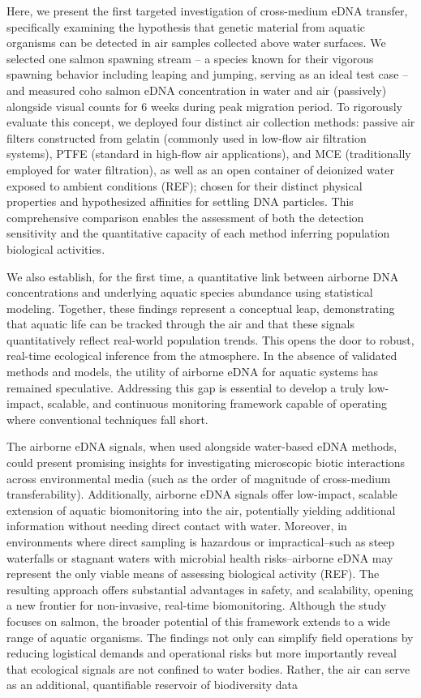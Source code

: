 \documentclass{article}
\begin{document}
Here, we present the first targeted investigation of cross-medium eDNA transfer, specifically examining the hypothesis that genetic material from aquatic organisms can be detected in air samples collected above water surfaces. We selected one salmon spawning stream -- a species known for their vigorous spawning behavior including leaping and jumping, serving as an ideal test case -- and measured coho salmon eDNA concentration in water and air (passively) alongside visual counts for 6 weeks during peak migration period. To rigorously evaluate this concept, we deployed four distinct air collection methods: passive air filters constructed from gelatin (commonly used in low-flow air filtration systems), PTFE (standard in high-flow air applications), and MCE (traditionally employed for water filtration), as well as an open container of deionized water exposed to ambient conditions (REF); chosen for their distinct physical properties and hypothesized affinities for settling DNA particles. This comprehensive comparison enables the assessment of both the detection sensitivity and the quantitative capacity of each method inferring population biological activities.

We also establish, for the first time, a quantitative link between airborne DNA concentrations and underlying aquatic species abundance using statistical modeling. Together, these findings represent a conceptual leap, demonstrating that aquatic life can be tracked through the air and that these signals quantitatively reflect real-world population trends. This opens the door to robust, real-time ecological inference from the atmosphere. In the absence of validated methods and models, the utility of airborne eDNA for aquatic systems has remained speculative. Addressing this gap is essential to develop a truly low-impact, scalable, and continuous monitoring framework capable of operating where conventional techniques fall short.

The airborne eDNA signals, when used alongside water-based eDNA methods, could present promising insights for investigating microscopic biotic interactions across environmental media (such as the order of magnitude of cross-medium transferability). Additionally, airborne eDNA signals offer low-impact, scalable extension of aquatic biomonitoring into the air, potentially yielding additional information without needing direct contact with water. Moreover, in environments where direct sampling is hazardous or impractical--such as steep waterfalls or stagnant waters with microbial health risks--airborne eDNA may represent the only viable means of assessing biological activity (REF). The resulting approach offers substantial advantages in safety, and scalability, opening a new frontier for non-invasive, real-time biomonitoring. Although the study focuses on salmon, the broader potential of this framework extends to a wide range of aquatic organisms. The findings not only can simplify field operations by reducing logistical demands and operational risks but more importantly reveal that ecological signals are not confined to water bodies. Rather, the air can serve as an additional, quantifiable reservoir of biodiversity data
\end{document}
